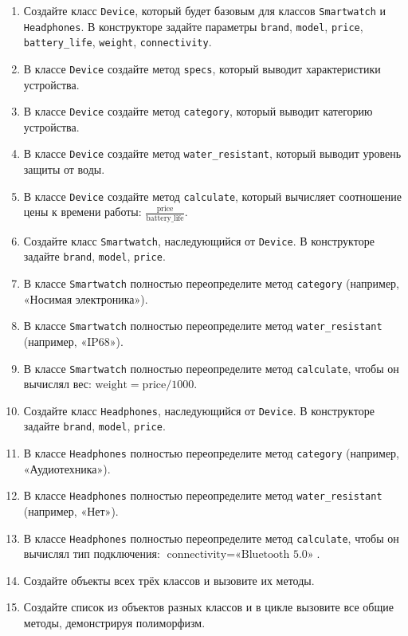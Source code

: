 \begin{enumerate}
\begin{enumerate}[leftmargin=*]
    \item Создайте класс \texttt{Device}, который будет базовым для классов \texttt{Smartwatch} и \texttt{Headphones}. В конструкторе задайте параметры \texttt{brand}, \texttt{model}, \texttt{price}, \texttt{battery\_life}, \texttt{weight}, \texttt{connectivity}.
    \item В классе \texttt{Device} создайте метод \texttt{specs}, который выводит характеристики устройства.
    \item В классе \texttt{Device} создайте метод \texttt{category}, который выводит категорию устройства.
    \item В классе \texttt{Device} создайте метод \texttt{water\_resistant}, который выводит уровень защиты от воды.
    \item В классе \texttt{Device} создайте метод \texttt{calculate}, который вычисляет соотношение цены к времени работы: \( \frac{\text{price}}{\text{battery\_life}} \).
    \item Создайте класс \texttt{Smartwatch}, наследующийся от \texttt{Device}. В конструкторе задайте \texttt{brand}, \texttt{model}, \texttt{price}.
    \item В классе \texttt{Smartwatch} полностью переопределите метод \texttt{category} (например, «Носимая электроника»).
    \item В классе \texttt{Smartwatch} полностью переопределите метод \texttt{water\_resistant} (например, «IP68»).
    \item В классе \texttt{Smartwatch} полностью переопределите метод \texttt{calculate}, чтобы он вычислял вес: \( \text{weight} = \text{price} / 1000 \).
    \item Создайте класс \texttt{Headphones}, наследующийся от \texttt{Device}. В конструкторе задайте \texttt{brand}, \texttt{model}, \texttt{price}.
    \item В классе \texttt{Headphones} полностью переопределите метод \texttt{category} (например, «Аудиотехника»).
    \item В классе \texttt{Headphones} полностью переопределите метод \texttt{water\_resistant} (например, «Нет»).
    \item В классе \texttt{Headphones} полностью переопределите метод \texttt{calculate}, чтобы он вычислял тип подключения: \( \text{connectivity} = \text{«Bluetooth 5.0»} \).
    \item Создайте объекты всех трёх классов и вызовите их методы.
    \item Создайте список из объектов разных классов и в цикле вызовите все общие методы, демонстрируя полиморфизм.

\end{enumerate}
\end{enumerate}
